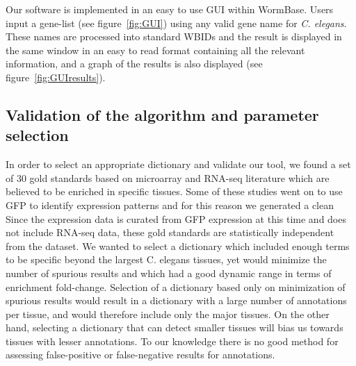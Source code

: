 \documentclass[linenumbers, doublespacing]{bmcart}
\begin{document}
	Our software is implemented in an easy to use GUI within WormBase. Users input a gene-list (see figure~\ref{fig:GUI}) using any valid gene name for \emph{C. elegans}. These names are processed into standard WBIDs and the result is displayed in the same window in an easy to read format containing all the relevant information, and a graph of the results is also displayed (see figure~\ref{fig:GUIresults}).
	
\subsection*{Validation of the algorithm and parameter selection}
	In order to select an appropriate dictionary and validate our tool, we found a set of 30 gold standards based on microarray and RNA-seq literature which are believed to be enriched in specific tissues\cite{Gaudet2004, Spencer2011, Cinar2005, Watson2008a, Pauli2006, Portman2004, Fox2007, Smith2010}. Some of these studies went on to use GFP to identify expression patterns and for this reason we generated a clean Since the expression data is curated from GFP expression at this time and does not include RNA-seq data, these gold standards are statistically independent from the dataset. We wanted to select a dictionary which included enough terms to be specific beyond the largest C. elegans tissues, yet would minimize the number of spurious results and which had a good dynamic range in terms of enrichment fold-change. Selection of a dictionary based only on minimization of spurious results would result in a dictionary with a large number of annotations per tissue, and would therefore include only the major tissues. On the other hand, selecting a dictionary that can detect smaller tissues will bias us towards tissues with lesser annotations. To our knowledge there is no good method for assessing false-positive or false-negative results for annotations. 
	
\end{document}
